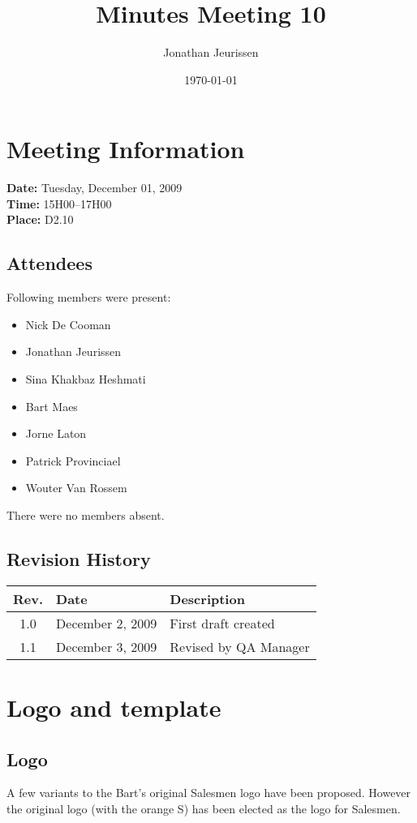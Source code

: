 \documentclass[a4paper, 12pt]{article}
\begin{document}
\title{Minutes Meeting 10}
\author{Jonathan Jeurissen}
\date{\today}

\maketitle	
	\section{Meeting Information}
		\textbf{Date:} Tuesday, December 01, 2009\\
		\textbf{Time:} 15H00--17H00\\
		\textbf{Place:} D2.10\\
		\subsection{Attendees}
Following members were present:
			\begin{itemize}
				\item Nick De Cooman
				\item Jonathan Jeurissen
				\item Sina Khakbaz Heshmati
				\item Bart Maes
				\item Jorne Laton
				\item Patrick Provinciael
				\item Wouter Van Rossem
			\end{itemize}
There were no members absent.
			
		\subsection{Revision History}
			\begin{tabular}{c | l | l }
				\textbf{Rev.} & \textbf{Date} & \textbf{Description} \\
				\hline
				1.0 & December 2, 2009 & First draft created \\
				1.1 & December 3, 2009 & Revised by QA Manager \\

			\end{tabular}		

	\section{Logo and template}
		\subsection{Logo}
A few variants to the Bart's original Salesmen logo have been proposed. However the original logo (with the orange S) has been elected as the logo for Salesmen.
\end{document}
